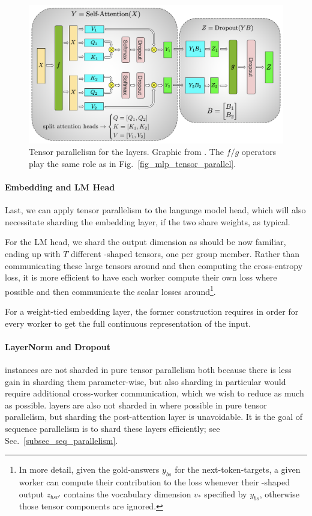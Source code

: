 \documentclass[11pt]{article}
\begin{document}
\begin{figure}[ht]
	\centering
	\includegraphics[scale=.45]{figures/attention_mp_2.png}
	\caption{Tensor parallelism for the  layers. Graphic from
		\cite{shoeybi2020megatronlm}. The $ f/g $ operators play the same role as in
		Fig.~\ref{fig_mlp_tensor_parallel}.}
	\label{fig_attn_tensor_parallel}
\end{figure}

\paragraph{Embedding and LM Head} Last, we can apply tensor parallelism to the language model head,
which will also necessitate sharding the embedding layer, if the two share weights, as typical.

For the LM head, we shard the output dimension as should be now familiar, ending up with $ T $
different -shaped tensors, one per group member. Rather than communicating
these large tensors around and then computing the cross-entropy loss, it is more efficient to have
each worker compute their own loss where possible and then communicate the scalar losses
around\footnote{In more detail, given the gold-answers $ y _{ bs } $ for the next-token-targets, a
	given worker can compute their contribution to the loss whenever their -shaped
	output $ z _{ bsv' } $ contains the vocabulary dimension $ v _{ * } $ specified by $ y _{ bs } $,
	otherwise those tensor components are ignored.}.

For a weight-tied embedding layer, the former construction requires  in order
for every worker to get the full continuous representation of the input.

\paragraph{LayerNorm and Dropout}  instances are not sharded in pure tensor
parallelism both because there is less gain in sharding them parameter-wise, but also sharding
 in particular would require additional cross-worker communication, which we
wish to reduce as much as possible.  layers are also not sharded in  where
possible in pure tensor parallelism, but sharding the post-attention  layer is
unavoidable. It is the goal of sequence parallelism is to shard these layers efficiently; see
Sec.~\ref{subsec_seq_parallelism}.
\end{document}
